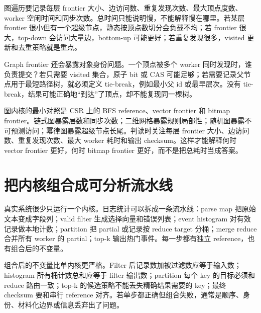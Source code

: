 图遍历要记录每层 frontier 大小、边访问数、重复发现次数、最大顶点度数、worker 空闲时间和同步次数。总时间只能说明慢，不能解释慢在哪里。若某层 frontier 很小但有一个超级节点，静态按顶点数切分会负载不均；若 frontier 很大，top-down 会访问大量边，bottom-up 可能更好；若重复发现很多，visited 更新和去重策略就是重点。

Graph frontier 还会暴露对象身份问题。一个顶点被多个 worker 同时发现时，谁负责提交？若只需要 visited 集合，原子 bit 或 CAS 可能足够；若需要记录父节点用于最短路径树，就必须定义 tie-break，例如最小父 id 或最早层次。没有 tie-break，结果可能正确地“到达”了顶点，却不能复现同一棵树。

图内核的最小对照是 CSR 上的 BFS reference、vector frontier 和 bitmap frontier。链式图暴露层数和同步次数；二维网格暴露规则局部性；随机图暴露不可预测访问；幂律图暴露超级节点长尾。判读时关注每层 frontier 大小、边访问数、重复发现次数、最大 worker 耗时和输出 checksum。这样才能解释何时 vector frontier 更好，何时 bitmap frontier 更好，而不是把总耗时当成答案。

\section{把内核组合成可分析流水线}

真实系统很少只运行一个内核。日志统计可以拆成一条流水线：parse map 把原始文本变成字段列；valid filter 生成选择向量和错误列表；event histogram 对有效记录做本地计数；partition 把 partial 或记录按 reduce target 分桶；merge reduce 合并所有 worker 的 partial；top-k 输出热门事件。每一步都有独立 reference，也有组合后的不变量。

组合后的不变量比单内核更严格。Filter 后记录数加被过滤数应等于输入数；histogram 所有桶计数总和应等于 filter 输出数；partition 每个 key 的目标必须和 reduce 路由一致；top-k 的候选策略不能丢失精确结果需要的 key；最终 checksum 要和串行 reference 对齐。若单步都正确但组合失败，通常是顺序、身份、材料化边界或信息丢弃出了问题。

